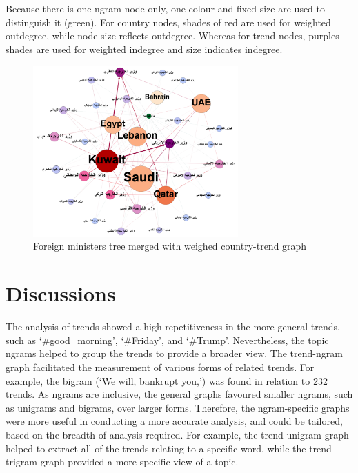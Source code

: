 \documentclass[conference]{IEEEtran}
\begin{document}
{Because there is one ngram node only, one colour and fixed size are used to distinguish it (green). For country nodes, shades of red are used for weighted outdegree, while node size reflects outdegree. Whereas for trend nodes, purples shades are used for weighted indegree and size indicates indegree.

\begin{figure}[htb] \centering
\includegraphics[width=0.7\textwidth]{images/ctn_graph.png}
\caption{Foreign ministers tree merged with weighed country-trend graph}
\label{fig:ctn_graph}
\end{figure}

\section{Discussions}\label{discussion}

The analysis of trends showed a high repetitiveness in the more general trends, 
such as ‘\#good\_morning’, ‘\#Friday’, and ‘\#Trump’. Nevertheless, the topic 
ngrams helped to group the trends to provide a broader view. The trend-ngram 
graph facilitated the measurement of various forms of related trends. 
For example, the bigram (‘We will, bankrupt you,’) was found in 
relation to 232 trends. As ngrams are inclusive, the general graphs favoured 
smaller ngrams, such as unigrams and bigrams, over larger forms. Therefore, 
the ngram-specific graphs were more useful in conducting a more accurate 
analysis, and could be tailored, based on the breadth of analysis required. 
For example, the trend-unigram graph helped to extract all of the trends relating 
to a specific word, while the trend-trigram graph provided a more specific view of a topic.
   
}
\end{document}

